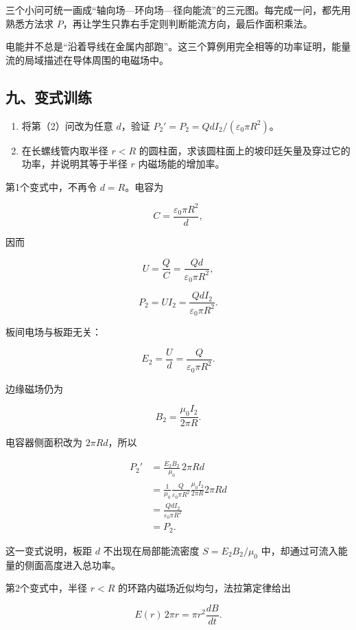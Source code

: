 \documentclass[12pt,a4paper,UTF8]{ctexart}
\newcommand{\tightlist}{\setlength{\itemsep}{0pt}\setlength{\parskip}{0pt}}
\begin{document}
三个小问可统一画成``轴向场---环向场---径向能流''的三元图。每完成一问，都先用熟悉方法求
\(P\)，再让学生只靠右手定则判断能流方向，最后作面积乘法。

电能并不总是``沿着导线在金属内部跑''。这三个算例用完全相等的功率证明，能量流的局域描述在导体周围的电磁场中。

\subsection{九、变式训练}\label{ux4e5dux53d8ux5f0fux8badux7ec3-4}

\begin{enumerate}
\def\labelenumi{\arabic{enumi}.}
\tightlist
\item
  将第（2）问改为任意 \(d\)，验证
  \(P_2'=P_2=QdI_2/(\varepsilon_0\pi R^2)\)。
\item
  在长螺线管内取半径 \(r<R\)
  的圆柱面，求该圆柱面上的坡印廷矢量及穿过它的功率，并说明其等于半径
  \(r\) 内磁场能的增加率。
\end{enumerate}

第1个变式中，不再令 \(d=R\)。电容为

\[C=\frac{\varepsilon_0\pi R^2}{d},\]

因而

\[U=\frac QC=\frac{Qd}{\varepsilon_0\pi R^2},\]

\[\boxed{P_2=UI_2
=\frac{QdI_2}{\varepsilon_0\pi R^2}}.\]

板间电场与板距无关：

\[E_2=\frac Ud=\frac{Q}{\varepsilon_0\pi R^2}.\]

边缘磁场仍为

\[B_2=\frac{\mu_0I_2}{2\pi R}.\]

电容器侧面积改为 \(2\pi Rd\)，所以

\[\begin{aligned}
P_2'
&=\frac{E_2B_2}{\mu_0}\,2\pi Rd\\
&=\frac1{\mu_0}
\frac{Q}{\varepsilon_0\pi R^2}
\frac{\mu_0I_2}{2\pi R}
2\pi Rd\\
&=\frac{QdI_2}{\varepsilon_0\pi R^2}\\
&=P_2.
\end{aligned}\]

这一变式说明，板距 \(d\) 不出现在局部能流密度 \(S=E_2B_2/\mu_0\)
中，却通过可流入能量的侧面高度进入总功率。

第2个变式中，半径 \(r<R\) 的环路内磁场近似均匀，法拉第定律给出

\[E(r)\,2\pi r
=\pi r^2\frac{dB}{dt}.\]
\end{document}
